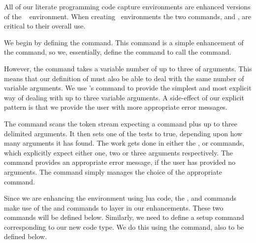 
\startchapter[title=The capture and manipulation of code]

All of our literate programming code capture environments are enhanced 
versions of the \ConTeXt\  environment. When creating 
 \ConTeXt\ environments the two commands, 
 and \type{\setupXXX}, are critical to their overall use. 

We begin by defining the  command. This command is a 
simple enhancement of the  command, so we, 
essentially, define the  command to call the 
 command.

However, the  command takes a variable number of up to 
three of arguments. This means that our definition of 
 must also be able to deal with the same number of 
variable arguments. We use \ConTeXt's \type{\dotripleempty} command to 
provide the simplest and most explicit way of dealing with up to three 
variable arguments. A side-effect of our explicit pattern is that we 
provide the user with more appropriate error messages. 

The \type{\dotripleempty} command scans the token stream expecting a 
command plus up to three \quote{[} \quote{]} delimited arguments. It then 
sets one of the \type{\ifXXXargument} tests to true, depending upon how 
many arguments it has found. The  work gets done in either the 
,  or 
 commands, which explicitly expect either one, 
two or three arguments respectively. The  
command provides an appropriate error message, if the user has provided no 
arguments. The  command simply manages the 
choice of the appropriate  command. 

Since we are enhancing the  environment using lua code, the 
,  and 
 commands make use of the 
\type{\fixStartLitProgs} and \type{\fixStopLitProgs} commands to layer in 
our enhancements. These two commands will be defined below. Similarly, we 
need to define a setup command corresponding to our new code type. We do 
this using the  command, also to be defined 
below. 

\startMkIVCode
\unexpanded{}

